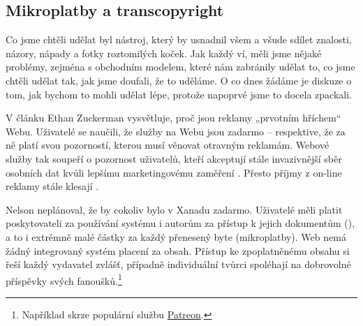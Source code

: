 
\subsection{Mikroplatby a transcopyright}

\begin{quoted}{\autocite{Zuckerman2014}}
Co jsme chtěli udělat byl nástroj, který by usnadnil všem a všude sdílet znalosti, názory, nápady a fotky roztomilých koček. Jak každý ví, měli jsme nějaké problémy, zejména s obchodním modelem, které nám zabránily udělat to, co jsme chtěli udělat tak, jak jsme doufali, že to uděláme. O co dnes žádáme je diskuze o tom, jak bychom to mohli udělat lépe, protože napoprvé jsme to docela zpackali.
\end{quoted}

V článku  Ethan Zuckerman vysvětluje, proč jsou reklamy „prvotním hříchem“ Webu. Uživatelé se naučili, že služby na Webu jsou zadarmo -- respektive, že za ně platí svou pozorností, kterou musí věnovat otravným reklamám. Webové služby tak soupeří o pozornost uživatelů, kteří akceptují stále invazivnější sběr osobních dat kvůli lepšímu marketingovému zaměření \autocite{Zuckerman2014}. Přesto příjmy z on-line reklamy stále klesají \autocite{WSJ:Ads}.

Nelson neplánoval, že by cokoliv bylo v Xanadu zadarmo. Uživatelé měli platit  poskytovateli za používání systému i autorům za přístup k jejich dokumentům (), a to i extrémně malé částky za každý přenesený byte (mikroplatby). Web nemá žádný integrovaný systém placení za obsah. Přístup ke zpoplatněnému obsahu si řeší každý vydavatel zvlášť, případně individuální tvůrci spoléhají na dobrovolné příspěvky svých fanoušků.\footnote{Například skrze populární službu \href{https://www.patreon.com/}{Patreon}.}

